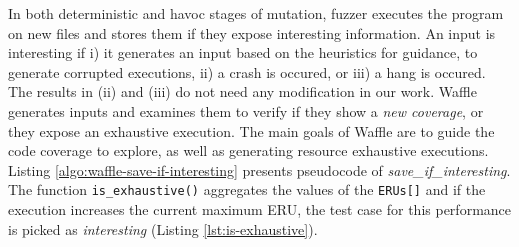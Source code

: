 
In both deterministic and havoc stages of mutation, fuzzer executes the program on new files and stores them if they expose interesting information. An input is interesting if i) it generates an input based on the heuristics for guidance, to generate corrupted executions, ii) a crash is occured, or iii) a hang is occured. The results in (ii) and (iii) do not need any modification in our work. Waffle generates inputs and examines them to verify if they show a \textit{new coverage}, or they expose an exhaustive execution. The main goals of Waffle are to guide the code coverage to explore, as well as generating resource exhaustive executions. Listing \ref{algo:waffle-save-if-interesting} presents pseudocode of \textit{save\_if\_interesting}. The function \texttt{is\_exhaustive()} aggregates the values of the \texttt{ERUs[]} and if the execution increases the current maximum ERU, the test case for this performance is picked as \textit{interesting} (Listing \ref{lst:is-exhaustive}).




\begin{minipage}{\linewidth}

\end{minipage}